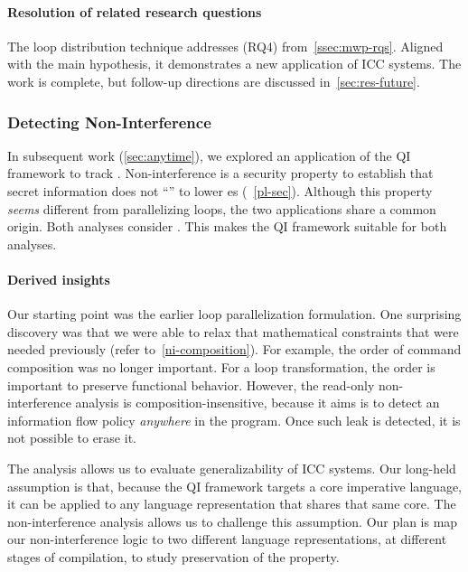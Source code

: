 \paragraph*{Resolution of related research questions}
The loop distribution technique addresses (RQ4) from~\autoref{ssec:mwp-rqs}.
Aligned with the main hypothesis, it demonstrates a new application of ICC
systems. The work is complete, but follow-up directions are discussed
in~\autoref{sec:res-future}.

\subsubsection{Detecting Non-Interference}
\label{subsubsec:qi-ni}

In subsequent work (\autoref{sec:anytime}), we explored an application of the QI
framework to track . Non-interference is a security
property to establish that secret information does not \enquote{} to
lower es (\cf~\autoref{pl-sec}). Although this property
\emph{seems} different from parallelizing loops, the two applications share a
common origin. Both analyses consider . This makes
the QI framework suitable for both analyses.

\paragraph*{Derived insights}
Our starting point was the earlier loop parallelization formulation. One
surprising discovery was that we were able to relax that mathematical
constraints that were needed previously (refer to~\autoref{ni-composition}). For
example, the order of command composition was no longer important. For a loop
transformation, the order is important to preserve functional behavior. However,
the read-only non-interference analysis is composition-insensitive, because it
aims is to detect an information flow policy
 \emph{anywhere} in the program. Once such leak is detected, it
is not possible to erase it.

The  analysis allows us to evaluate generalizability of
ICC systems. Our long-held assumption is that, because the QI framework targets
a core imperative language, it can be applied to any language representation
that shares that same core. The non-interference analysis allows us to challenge
this assumption. Our plan is map our non-interference logic to two different
language representations, at different stages of compilation, to study
preservation of the  property.

